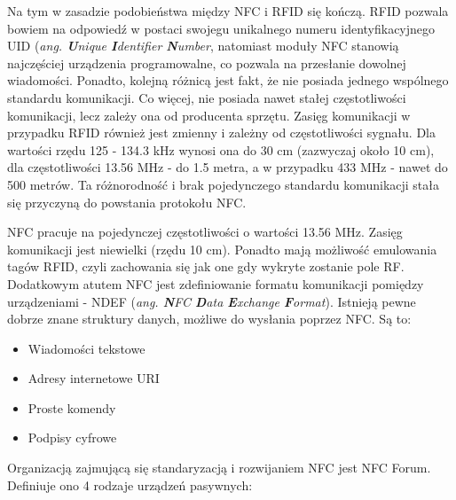 Na tym w zasadzie podobieństwa między NFC i RFID się kończą. RFID pozwala bowiem na odpowiedź w postaci swojegu unikalnego numeru identyfikacyjnego UID (\textit{ang. \textbf{U}nique \textbf{I}dentifier \textbf{N}umber}, natomiast moduły NFC stanowią najczęściej urządzenia programowalne, co pozwala na przesłanie dowolnej wiadomości. Ponadto, kolejną różnicą jest fakt, że nie posiada jednego wspólnego standardu komunikacji. Co więcej, nie posiada nawet stałej częstotliwości komunikacji, lecz zależy ona od producenta sprzętu.  Zasięg komunikacji w przypadku RFID również jest zmienny i zależny od częstotliwości sygnału. Dla wartości rzędu 125 - 134.3 kHz wynosi ona do 30 cm (zazwyczaj około 10 cm), dla częstotliwości 13.56 MHz - do 1.5 metra, a w przypadku 433 MHz - nawet do 500 metrów. Ta różnorodność i brak pojedynczego standardu komunikacji stała się przyczyną do powstania protokołu NFC.

NFC pracuje na pojedynczej częstotliwości o wartości 13.56 MHz. Zasięg komunikacji jest niewielki (rzędu 10 cm). Ponadto mają możliwość emulowania tagów RFID, czyli zachowania się jak one gdy wykryte zostanie pole RF. Dodatkowym atutem NFC jest zdefiniowanie formatu komunikacji pomiędzy urządzeniami - NDEF (\textit{ang. \textbf{N}FC \textbf{D}ata \textbf{E}xchange \textbf{F}ormat}). Istnieją pewne dobrze znane struktury danych, możliwe do wysłania poprzez NFC. Są to:

\begin{itemize}
\item Wiadomości tekstowe
\item Adresy internetowe URI
\item Proste komendy
\item Podpisy cyfrowe
\end{itemize}

Organizacją zajmującą się standaryzacją i rozwijaniem NFC jest NFC Forum. Definiuje ono 4 rodzaje urządzeń pasywnych:

